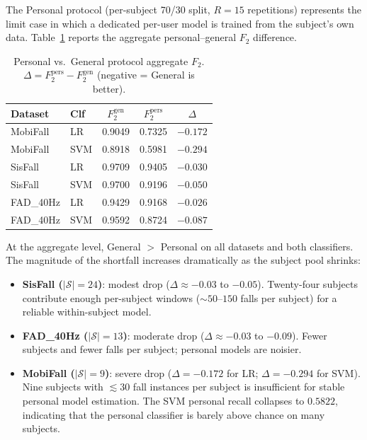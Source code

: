 \documentclass[onluarkali,ingilizce,yukseklisans,karton,LisansustuEgitim]{itutez}
\providecommand{\1}{\mathbf{1}}
\providecommand{\Sset}{\mathcal{S}}
\begin{document}
The Personal protocol (per-subject 70/30 split, $R=15$ repetitions) represents the
limit case in which a dedicated per-user model is trained from the subject's own data.
Table~\ref{tab:personal-delta} reports the aggregate personal--general $F_2$ difference.

\begin{table}[h!]
\centering
\caption{Personal vs.\ General protocol aggregate $F_2$.
  $\Delta = F_2^{\mathrm{pers}} - F_2^{\mathrm{gen}}$ (negative = General is better).}
\label{tab:personal-delta}
\small
\begin{tabular}{llccc}
\toprule
\textbf{Dataset} & \textbf{Clf} & $F_2^{\mathrm{gen}}$ & $F_2^{\mathrm{pers}}$ & $\Delta$ \\
\midrule
MobiFall  & LR  & 0.9049 & 0.7325 & $-0.172$ \\
MobiFall  & SVM & 0.8918 & 0.5981 & $-0.294$ \\
SisFall   & LR  & 0.9709 & 0.9405 & $-0.030$ \\
SisFall   & SVM & 0.9700 & 0.9196 & $-0.050$ \\
FAD\_40Hz & LR  & 0.9429 & 0.9168 & $-0.026$ \\
FAD\_40Hz & SVM & 0.9592 & 0.8724 & $-0.087$ \\
\bottomrule
\end{tabular}
\end{table}

At the aggregate level, General $>$ Personal on all datasets and both classifiers.
The magnitude of the shortfall increases dramatically as the subject pool shrinks:

\begin{itemize}
\item \textbf{SisFall ($|\Sset|=24$)}: modest drop ($\Delta \approx -0.03$ to
  $-0.05$).  Twenty-four subjects contribute enough per-subject windows
  (${\sim}50$--$150$ falls per subject) for a reliable within-subject model.
\item \textbf{FAD\_40Hz ($|\Sset|=13$)}: moderate drop ($\Delta \approx -0.03$
  to $-0.09$).  Fewer subjects and fewer falls per subject; personal models are
  noisier.
\item \textbf{MobiFall ($|\Sset|=9$)}: severe drop ($\Delta=-0.172$ for LR;
  $\Delta=-0.294$ for SVM).  Nine subjects with $\lesssim30$ fall instances per
  subject is insufficient for stable personal model estimation.  The SVM personal
  recall collapses to $0.5822$, indicating that the personal classifier is barely
  above chance on many subjects.
\end{itemize}
\end{document}
